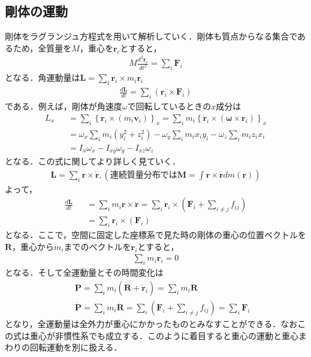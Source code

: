 \documentclass[../Main.tex]{subfiles}
\begin{document}
\subsection{剛体の運動}
剛体をラグランジュ方程式を用いて解析していく．剛体も質点からなる集合であるため，全質量を$M$，重心を$\bm{r}_c$とすると，
\begin{eqnarray}
  M\frac{d^2\bm{r}_c}{dt^2} = \sum_i \bm{F}_i
\end{eqnarray}
となる．角運動量は$\bm{L} = \sum_i \bm{r}_i\times m_i \bm{r}_i$
\begin{eqnarray}
  \frac{d\bm{L}}{dt} = \sum_i ( \bm{r}_i \times \bm{F}_i )
\end{eqnarray}
である．例えば，剛体が角速度$\omega$で回転しているときの$x$成分は
\begin{eqnarray}
  L_x &&= \sum_i \left\{ \bm{r}_i \times (m_i \bm{v}_i) \right\}_x = \sum_i m_i\left\{ \bm{r}_i \times ( \bm{\omega}\times \bm{r}_i) \right\}_x \\
  &&= \omega_x \sum_i m_i \left( y_i^2 + z_i^2 \right) -\omega_y\sum_i m_i x_iy_i -\omega_z \sum_i m_i z_ix_i\\
  &&= I_x \omega_x - I_{xy}\omega_y - I_{xz}\omega_z
\end{eqnarray}
となる．この式に関してより詳しく見ていく．
\begin{eqnarray}
  \bm{L} = \sum_i \bm{r}\times\dot{\bm{r}}, \left( 連続質量分布では\bm{M} = \int\bm{r}\times\dot{\bm{r}}dm(\bm{r}) \right)
\end{eqnarray}
よって，
\begin{eqnarray}
  \frac{d\bm{L}}{dt} &&= \sum_i m_{i}\bm{r}\times\ddot{\bm{r}} = \sum_i \bm{r}_i \times\left( \bm{F}_i + \sum_{i\neq j}f_{ij} \right)\\
  &&= \sum_i \bm{r}_i \times\left( \bm{F}_i \right)
\end{eqnarray}
となる．ここで，空間に固定した座標系で見た時の剛体の重心の位置ベクトルを$\bm{R}$，重心から$m_i$までのベクトルを$\bm{r}_i$とすると，
\begin{eqnarray}
  \sum_i m_i \bm{r}_i= 0
\end{eqnarray}
となる．そして全運動量とその時間変化は
\begin{eqnarray}
  &&\bm{P}= \sum_i m_i \left( \dot{\bm{R}} + \dot{\bm{r}}_i \right) =  \sum_i m_i\dot{\bm{R}}\\
  &&\dot{\bm{P}} = \sum_i m_i\ddot{\bm{R}} = \sum_i \left( \bm{F}_i + \sum_{i\neq j}f_{ij} \right) =  \sum_i\bm{F}_i 
\end{eqnarray}
となり，全運動量は全外力が重心にかかったものとみなすことができる．なおこの式は重心が非慣性系でも成立する．このように着目すると重心の運動と重心まわりの回転運動を別に扱える．
\end{document}
